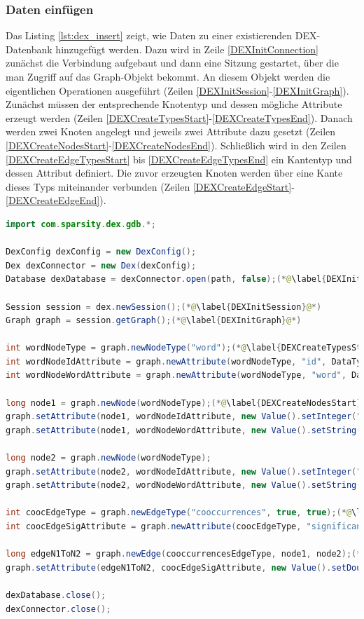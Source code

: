\documentclass[11pt, a4paper, oneside]{article} %
\begin{document}
\subsubsection{Daten einfügen}

Das Listing \ref{lst:dex_insert} zeigt, wie Daten zu einer existierenden DEX-Datenbank hinzugefügt werden. Dazu wird in Zeile \ref{DEXInitConnection} zunächst die Verbindung aufgebaut und dann eine Sitzung gestartet, über die man Zugriff auf das Graph-Objekt bekommt. An diesem Objekt werden die eigentlichen Operationen ausgeführt (Zeilen \ref{DEXInitSession}-\ref{DEXInitGraph}). Zunächst müssen der entsprechende Knotentyp und dessen mögliche Attribute erzeugt werden (Zeilen \ref{DEXCreateTypesStart}-\ref{DEXCreateTypesEnd}). Danach werden zwei Knoten angelegt und jeweils zwei Attribute dazu gesetzt (Zeilen \ref{DEXCreateNodesStart}-\ref{DEXCreateNodesEnd}). Schließlich wird in den Zeilen \ref{DEXCreateEdgeTypesStart} bis \ref{DEXCreateEdgeTypesEnd} ein Kantentyp und dessen Attribut definiert. Die zuvor erzeugten Knoten werden über eine Kante dieses Typs miteinander verbunden (Zeilen \ref{DEXCreateEdgeStart}-\ref{DEXCreateEdgeEnd}).

\begin{lstlisting}[caption={DEX - Daten einfügen},label={lst:dex_insert},language=Java]
import com.sparsity.dex.gdb.*;

DexConfig dexConfig = new DexConfig();
Dex dexConnector = new Dex(dexConfig);
Database dexDatabase = dexConnector.open(path, false);(*@\label{DEXInitConnection}@*)

Session session = dex.newSession();(*@\label{DEXInitSession}@*)
Graph graph = session.getGraph();(*@\label{DEXInitGraph}@*)

int wordNodeType = graph.newNodeType("word");(*@\label{DEXCreateTypesStart}@*)
int wordNodeIdAttribute = graph.newAttribute(wordNodeType, "id", DataType.Integer, AttributeKind.Indexed);
int wordNodeWordAttribute = graph.newAttribute(wordNodeType, "word", DataType.String, AttributeKind.Basic);(*@\label{DEXCreateTypesEnd}@*)

long node1 = graph.newNode(wordNodeType);(*@\label{DEXCreateNodesStart}@*)
graph.setAttribute(node1, wordNodeIdAttribute, new Value().setInteger("1"));
graph.setAttribute(node1, wordNodeWordAttribute, new Value().setString("Car"));

long node2 = graph.newNode(wordNodeType);
graph.setAttribute(node2, wordNodeIdAttribute, new Value().setInteger("2"));
graph.setAttribute(node2, wordNodeWordAttribute, new Value().setString("Tree"));(*@\label{DEXCreateNodesEnd}@*)

int coocEdgeType = graph.newEdgeType("cooccurrences", true, true);(*@\label{DEXCreateEdgeTypesStart}@*)
int coocEdgeSigAttribute = graph.newAttribute(coocEdgeType, "significance", DataType.Double, AttributeKind.Indexed);(*@\label{DEXCreateEdgeTypesEnd}@*)

long edgeN1ToN2 = graph.newEdge(cooccurrencesEdgeType, node1, node2);(*@\label{DEXCreateEdgeStart}@*)
graph.setAttribute(edgeN1ToN2, coocEdgeSigAttribute, new Value().setDouble(1.5));(*@\label{DEXCreateEdgeEnd}@*)

dexDatabase.close();
dexConnector.close();
\end{lstlisting}
\end{document}
